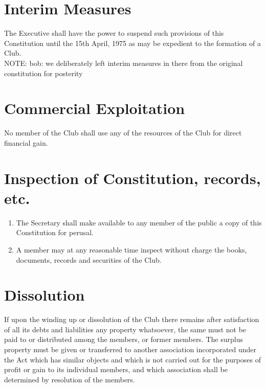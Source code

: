 \documentclass[11pt]{article} %
\begin{document}
\section{Interim Measures}
The Executive shall have the power to suspend such provisions of this Constitution until the 15th April, 1975 as may be expedient to the formation of a Club.\\
{\color{Cyan}NOTE:
bob: we deliberately left interim measures in there from the original constitution for posterity
}

\section{Commercial Exploitation}
No member of the Club shall use any of the resources of the Club for direct financial gain.

\section{Inspection of Constitution, records, etc.}
\begin{enumerate}
	\item The Secretary shall make available to any member of the public a copy of this Constitution for perusal.
	\item A member may at any reasonable time inspect without charge the books, documents, records and securities of the Club.
\end{enumerate}

\section{Dissolution}
If upon the winding up or dissolution of the Club there remains after satisfaction of all its debts and liabilities any property whatsoever, the same must not be paid to or distributed among the members, or former members. The surplus property must be given or transferred to another association incorporated under the Act which has similar objects and which is not carried out for the purposes of profit or gain to its individual members, and which association shall be determined by resolution of the members.
\end{document}
